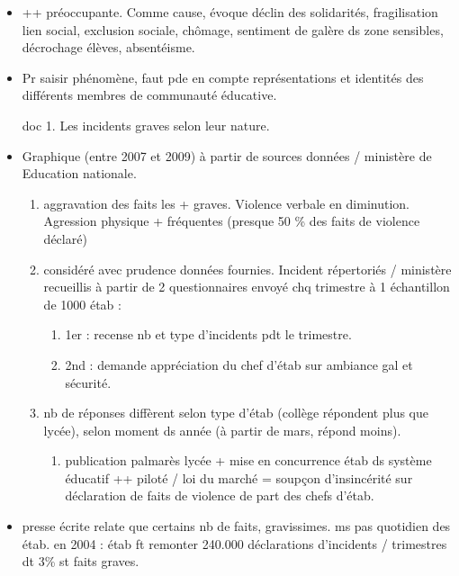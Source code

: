 \documentclass[12pt]{article}
\begin{document}
\begin{itemize}
\item ++ préoccupante. Comme cause, évoque déclin des solidarités, fragilisation lien social, exclusion sociale, chômage, sentiment de galère ds zone sensibles, décrochage élèves, absentéisme. \\

\item Pr saisir phénomène, faut pde en compte représentations et identités des différents membres de communauté éducative.

doc 1. Les incidents graves selon leur nature.

\item Graphique (entre 2007 et 2009) à partir de sources données / ministère de Education nationale.
\begin{enumerate}
\item aggravation des faits les + graves. Violence verbale en diminution. Agression physique + fréquentes (presque 50 \% des faits de violence déclaré) \\
\item considéré avec prudence données fournies. Incident répertoriés / ministère recueillis à partir de 2 questionnaires envoyé chq trimestre à 1 échantillon de 1000 étab : 
\begin{enumerate}
\item 1er : recense nb et type d'incidents pdt le trimestre.\\
\item 2nd : demande appréciation du chef d'étab sur ambiance gal et sécurité.\\
\end{enumerate}

\item nb de réponses diffèrent selon type d'étab (collège répondent plus que lycée), selon moment ds année (à partir de mars, répond moins). \\
\begin{enumerate}
\item publication palmarès lycée + mise en concurrence étab ds système éducatif ++ piloté / loi du marché = soupçon d'insincérité sur déclaration de faits de violence de part des chefs d'étab.\\
\end{enumerate}

\end{enumerate}

\item presse écrite relate que certains nb de faits, gravissimes. ms pas quotidien des étab. en 2004 :  étab ft remonter 240.000 déclarations d'incidents / trimestres dt 3\% st faits graves.\\


\end{itemize}
\end{document}
